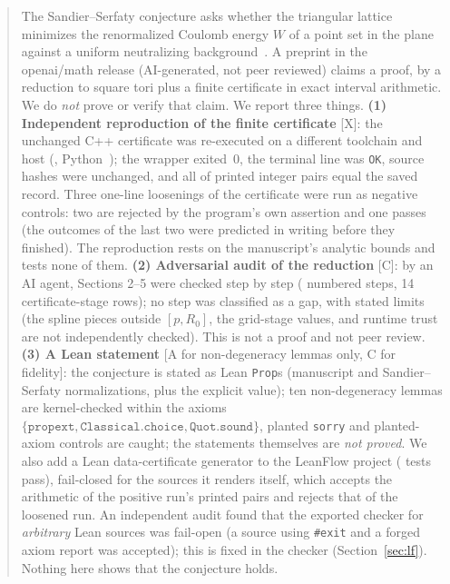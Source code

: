 \documentclass[10pt]{article}
\newcommand{\tier}[1]{\textsf{[#1]}}
\newcommand{\lean}[1]{\texttt{#1}}
\begin{document}
\begin{abstract}
The Sandier--Serfaty conjecture asks whether the triangular lattice minimizes the renormalized Coulomb energy $W$ of a
point set in the plane against a uniform neutralizing background~\cite{ss}. A preprint in the openai/math release
\cite{oai} (AI-generated, not peer reviewed) claims a proof, by a reduction to square tori plus a finite certificate in
exact interval arithmetic. We do \emph{not} prove or verify that claim. We report three things.
\textbf{(1) Independent reproduction of the finite certificate} \tier{X}: the unchanged C++ certificate was re-executed
on a different toolchain and host (\texttt{\SSACompiler}, Python~\SSAPython); the wrapper exited~0, the terminal line was
\texttt{OK}, source hashes were unchanged, and all \SSAPairsEqual{} of \SSAPairsTotal{} printed integer pairs equal the saved
record. Three one-line loosenings of the certificate were run as negative controls: two are rejected by the program's own
assertion and one passes (the outcomes of the last two were predicted in writing before they finished). The reproduction rests on the manuscript's analytic bounds and
tests none of them.
\textbf{(2) Adversarial audit of the reduction} \tier{C}: by an AI agent, Sections 2--5 were checked step by step
(\SSAnSteps{} numbered steps, 14 certificate-stage rows); no step was classified as a gap, with stated limits (the
spline pieces outside $[p,R_0]$, the grid-stage values, and runtime trust are not independently checked). This is not a proof and not peer review.
\textbf{(3) A Lean statement} \tier{A for non-degeneracy lemmas only, C for fidelity}: the conjecture is stated as Lean
\lean{Prop}s (manuscript and Sandier--Serfaty normalizations, plus the explicit value); ten non-degeneracy lemmas are
kernel-checked within the axioms $\{\lean{propext},\lean{Classical.choice},\lean{Quot.sound}\}$, planted
\lean{sorry} and planted-axiom controls are caught; the statements themselves are \emph{not proved}.
We also add a Lean data-certificate generator to the LeanFlow project (\SSALFPassed{} tests pass), fail-closed for the sources it renders itself, which accepts
the arithmetic of the positive run's printed pairs and rejects that of the loosened run. An independent audit found that the exported checker
for \emph{arbitrary} Lean sources was fail-open (a source using \lean{\#exit} and a forged axiom report was accepted); this is fixed in the
checker (Section~\ref{sec:lf}). Nothing here shows that the conjecture holds.
\end{abstract}
\end{document}
